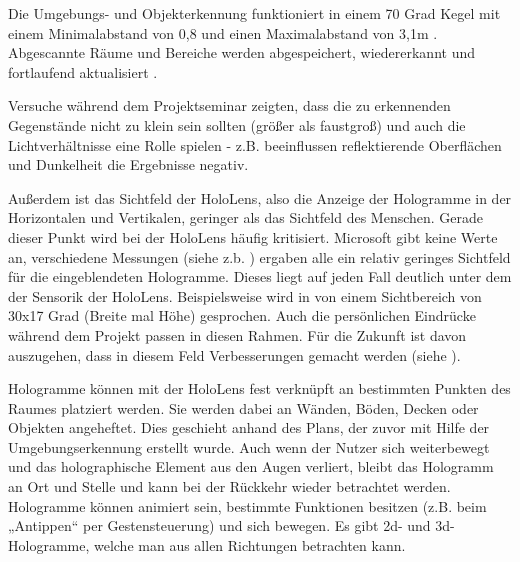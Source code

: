 \documentclass[conference, 11pt]{IEEEtran}
\begin{document}
Die Umgebungs- und Objekterkennung funktioniert in einem 70 Grad Kegel mit einem Minimalabstand von 0,8 und einen Maximalabstand von 3,1m \cite{Design}. Abgescannte Räume und Bereiche werden abgespeichert, wiedererkannt und fortlaufend aktualisiert \cite{Mapping}. \par
Versuche während dem Projektseminar zeigten, dass die zu erkennenden Gegenstände nicht zu klein sein sollten (größer als faustgroß) und auch die Lichtverhältnisse eine Rolle spielen - z.B. beeinflussen reflektierende Oberflächen und Dunkelheit die Ergebnisse negativ. \par
Außerdem ist das Sichtfeld der HoloLens, also die Anzeige der Hologramme in der Horizontalen und Vertikalen, geringer als das Sichtfeld des Menschen. Gerade dieser Punkt wird bei der HoloLens häufig kritisiert. Microsoft gibt keine Werte an, verschiedene Messungen (siehe z.b. \cite{see}) ergaben alle ein relativ geringes Sichtfeld für die eingeblendeten Hologramme. Dieses liegt auf jeden Fall deutlich unter dem der Sensorik der HoloLens. Beispielsweise wird in \cite{fov} von einem Sichtbereich von 30x17 Grad (Breite mal Höhe) gesprochen. Auch die persönlichen Eindrücke während dem Projekt passen in diesen Rahmen. Für die Zukunft ist davon auszugehen, dass in diesem Feld Verbesserungen gemacht werden (siehe \cite{fovpatent}). \par  
Hologramme können mit der HoloLens fest verknüpft an bestimmten Punkten des Raumes platziert werden. Sie werden dabei an Wänden, Böden, Decken oder Objekten angeheftet. Dies geschieht anhand des Plans, der zuvor mit Hilfe der Umgebungserkennung erstellt wurde. Auch wenn der Nutzer sich weiterbewegt und das holographische Element aus den Augen verliert, bleibt das Hologramm an Ort und Stelle und kann bei der Rückkehr wieder betrachtet werden. Hologramme können animiert sein, bestimmte Funktionen besitzen (z.B. beim „Antippen“ per Gestensteuerung) und sich bewegen. Es gibt 2d- und 3d-Hologramme, welche man aus allen Richtungen betrachten kann. 
\end{document}
